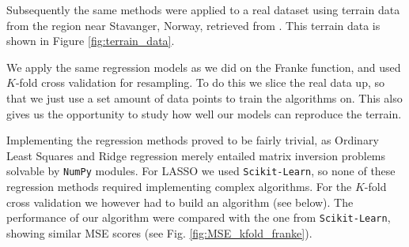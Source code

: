 \documentclass[norsk,a4paper,12pt]{article}
\begin{document}
\begin{multicols}{2}
Subsequently the same methods were applied to a real dataset using terrain data from the region near Stavanger, Norway, retrieved from \cite{terrain}. This terrain data is shown in Figure \ref{fig:terrain_data}. 


We apply the same regression models as we did on the Franke function, and used $K$-fold cross validation for resampling. To do this we slice the real data up, so that we just use a set amount of data points to train the algorithms on. This also gives us the opportunity to study how well our models can reproduce the terrain.


Implementing the regression methods proved to be fairly trivial, as Ordinary Least Squares and Ridge regression merely entailed matrix inversion problems solvable by \texttt{NumPy} modules. For LASSO we used \texttt{Scikit-Learn}, so none of these regression methods required implementing complex algorithms. For the $K$-fold cross validation we however had to build an algorithm (see below). The performance of our algorithm were compared with the one from \texttt{Scikit-Learn}, showing similar MSE scores (see Fig. \ref{fig:MSE_kfold_franke}).


\end{multicols}
\end{document}
